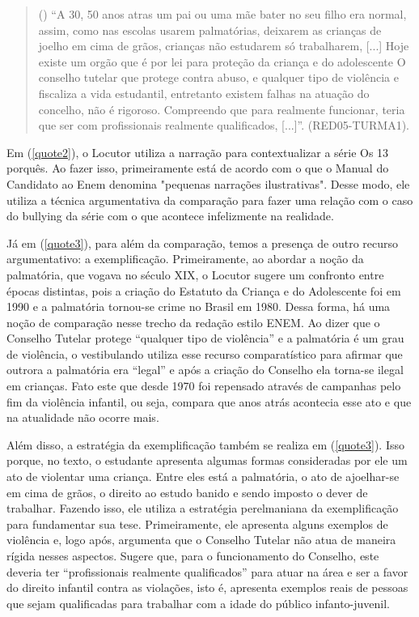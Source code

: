 \documentclass{textolivre}
\newcounter{quote}
\newenvironment{myquote}%
{%
\refstepcounter{quote}%
\begin{quote}(\thequote)%
}%
{\end{quote}}%
\begin{document}
\begin{myquote}\label{quote3}
“A 30, 50 anos atras um pai ou uma mãe bater no seu filho era normal, assim, como nas escolas usarem palmatórias, deixarem as crianças de joelho em cima de grãos, crianças não estudarem só trabalharem, [...] Hoje existe um orgão que é por lei para proteção da criança e do adolescente O conselho tutelar que protege contra abuso, e qualquer tipo de violência e fiscaliza a vida estudantil, entretanto existem falhas na atuação do concelho, não é rigoroso. Compreendo que para realmente funcionar, teria que ser com profissionais realmente qualificados, [...]”. (RED05-TURMA1).
\end{myquote}

Em (\ref{quote2}), o Locutor utiliza a narração para contextualizar a série Os 13 porquês. Ao fazer isso, primeiramente está de acordo com o que o Manual do Candidato ao Enem denomina "pequenas narrações ilustrativas". Desse modo, ele utiliza a técnica argumentativa da comparação para fazer uma relação com o caso do bullying da série com o que acontece infelizmente na realidade. 

Já em (\ref{quote3}), para além da comparação, temos a presença de outro recurso argumentativo: a exemplificação. Primeiramente, ao abordar a noção da palmatória, que vogava no século XIX, o Locutor sugere um confronto entre épocas distintas, pois a criação do Estatuto da Criança e do Adolescente foi em 1990 e a palmatória tornou-se crime no Brasil em 1980. Dessa forma, há uma noção de comparação nesse trecho da redação estilo ENEM. Ao dizer que o Conselho Tutelar protege “qualquer tipo de violência” e a palmatória é um grau de violência, o vestibulando utiliza esse recurso comparatístico para afirmar que outrora a palmatória era “legal” e após a criação do Conselho ela torna-se ilegal em crianças. Fato este que desde 1970 foi repensado através de campanhas pelo fim da violência infantil, ou seja, compara que anos atrás acontecia esse ato e que na atualidade não ocorre mais. 

Além disso, a estratégia da exemplificação também se realiza em (\ref{quote3}). Isso porque, no texto, o estudante apresenta algumas formas consideradas por ele um ato de violentar uma criança. Entre eles está a palmatória, o ato de ajoelhar-se em cima de grãos, o direito ao estudo banido e sendo imposto o dever de trabalhar. Fazendo isso, ele utiliza a estratégia perelmaniana da exemplificação para fundamentar sua tese. Primeiramente, ele apresenta alguns exemplos de violência e, logo após, argumenta que o Conselho Tutelar não atua de maneira rígida nesses aspectos. Sugere que, para o funcionamento do Conselho, este deveria ter “profissionais realmente qualificados” para atuar na área e ser a favor do direito infantil contra as violações, isto é, apresenta exemplos reais de pessoas que sejam qualificadas para trabalhar com a idade do público infanto-juvenil.  
\end{document}
